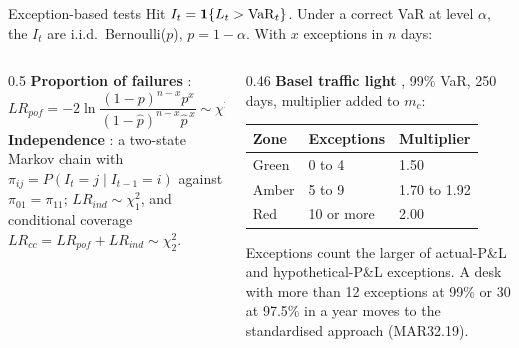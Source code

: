 \documentclass[aspectratio=169,10pt]{beamer}
\begin{document}
\begin{frame}{Exception-based tests}
  \small
  Hit $I_t = \mathbf{1}\{L_t > \mathrm{VaR}_{t}\}$. Under a correct VaR at level $\alpha$, the $I_t$ are i.i.d.\ Bernoulli($p$), $p = 1 - \alpha$. With $x$ exceptions in $n$ days:
  \begin{columns}[T]
    \begin{column}{0.5\textwidth}
      \textbf{Proportion of failures} \citep{kupiec1995techniques}:
      \[ LR_{pof} = -2\ln\frac{(1-p)^{n-x}p^x}{(1-\hat p)^{n-x}\hat p^{\,x}} \sim \chi^2_1,\quad \hat p = x/n. \]
      \textbf{Independence} \citep{christoffersen1998evaluating}: a two-state Markov chain with $\pi_{ij} = P(I_t = j \mid I_{t-1} = i)$ against $\pi_{01} = \pi_{11}$; $LR_{ind} \sim \chi^2_1$, and conditional coverage $LR_{cc} = LR_{pof} + LR_{ind} \sim \chi^2_2$.
    \end{column}
    \begin{column}{0.46\textwidth}
      \textbf{Basel traffic light} \citep{bcbs2023mar32}, 99\% VaR, 250 days, multiplier added to $m_c$:
      \vspace{0.2em}

      \footnotesize
      \begin{tabular}{lll}
        \toprule
        Zone & Exceptions & Multiplier \\
        \midrule
        Green & 0 to 4 & 1.50 \\
        Amber & 5 to 9 & 1.70 to 1.92 \\
        Red & 10 or more & 2.00 \\
        \bottomrule
      \end{tabular}
      \vspace{0.3em}

      \small Exceptions count the larger of actual-P\&L and hypothetical-P\&L exceptions. A desk with more than 12 exceptions at 99\% or 30 at 97.5\% in a year moves to the standardised approach (MAR32.19).
    \end{column}
  \end{columns}
\end{frame}
\end{document}
